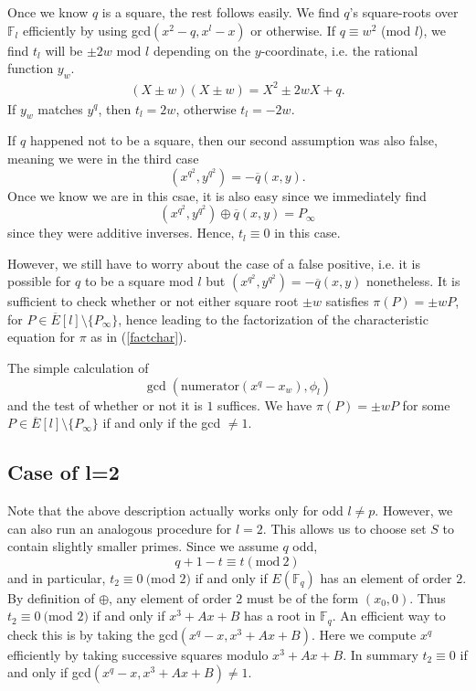 \documentclass{article}
\newcommand{\f}{\mathbb{F}}
\begin{document}
Once we know $q$ is a square, the rest follows easily.  We find $q$'s square-roots over $\f_l$ efficiently by using gcd$(x^2-q,x^l-x)$ or otherwise.
If $q \equiv w^2$ (mod $l$), we find $t_l$
will be $\pm 2w$ mod $l$ depending on the $y$-coordinate, i.e. the
rational function $y_w$.  \begin{eqnarray} \label{factchar} (X\pm w)(X\pm w) = X^2 \pm 2wX + q.\end{eqnarray} If $y_w$ matches $y^q$, then $t_l = 2w$,
otherwise $t_l = -2w$.  

If $q$ happened not to be a square, then our second assumption was also false, meaning we were in the third case 
$$(x^{q^2},y^{q^2})  = -\overline{q}(x,y).$$  Once we know we are in this csae, it is also easy since we immediately find 
$$(x^{q^2},y^{q^2})  \oplus \overline{q}(x,y) = P_\infty$$ since they were additive inverses.  Hence, $t_l \equiv 0$ in this case.

However, we still have to worry about the case of a false positive, i.e. it is possible for $q$ to be a square mod $l$ but 
$(x^{q^2},y^{q^2})  = -\overline{q}(x,y)$ nonetheless.  It is sufficient to check whether or not either square root $\pm w$ satisfies 
$\pi(P) = \pm wP$, for $P \in  \overline{E}[l]\setminus\{P_\infty\}$, hence 
leading to the factorization of the characteristic equation for $\pi$ as in (\ref{factchar}).   

The simple calculation of $$\gcd(\mathrm{numerator}(x^q-x_w),\phi_l)$$ and the test of whether or not it is $1$ suffices.
We have $\pi(P) = \pm wP$ for some $P \in  \overline{E}[l]\setminus\{P_\infty\}$ if and only if the gcd $\not = 1$.

\subsection{Case of l=2} \label{Case22}

Note that the above description actually works only for odd $l \not
= p$. However, we can also run an analogous procedure for $l=2$.
This allows us to choose set $S$ to contain slightly smaller primes.
Since we assume $q$ odd, $$q+1 - t \equiv t (\mathrm{mod~}2)$$ and
in particular, $t_2 \equiv 0 ~($mod $2)$ if and only if $E(\f_q)$
has an element of order $2$.  By definition of $\oplus$, any element
of order $2$ must be of the form $(x_0,0)$.  Thus $t_2 \equiv 0
~($mod $2)$ if and only if $x^3+Ax+B$ has a root in $\f_q$.  An
efficient way to check this is by taking the gcd$(x^q-x, x^3+Ax+B)$.
Here we compute $x^q$ efficiently by taking successive squares
modulo $x^3+Ax+B$.  In summary $t_2 \equiv 0$ if and only if
gcd$(x^q-x, x^3+Ax+B) \not = 1.$
\end{document}
